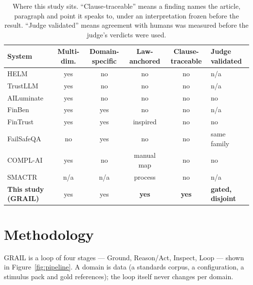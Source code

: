 \documentclass[11pt,a4paper]{article}
\begin{document}
\begin{table}[h]
\centering\footnotesize
\setlength{\tabcolsep}{4pt}
\begin{tabular}{@{}lccccl@{}}
\toprule
System & Multi-dim. & Domain-specific & Law-anchored & Clause-traceable & Judge validated \\
\midrule
HELM \cite{helm}              & yes & no   & no      & no & n/a \\
TrustLLM \cite{trustllm}      & yes & no   & no      & no & n/a \\
AILuminate \cite{ailuminate}  & yes & no   & no      & no & no \\
FinBen \cite{finben}          & yes & yes  & no      & no & n/a \\
FinTrust \cite{fintrust}      & yes & yes  & inspired& no & no \\
FailSafeQA \cite{failsafeqa}  & no  & yes  & no      & no & same family \\
COMPL-AI \cite{complai}       & yes & no   & manual map & no & no \\
SMACTR \cite{raji2020}        & n/a & n/a  & process & no & n/a \\
\textbf{This study (GRAIL)}   & yes & yes  & \textbf{yes} & \textbf{yes} & \textbf{gated, disjoint} \\
\bottomrule
\end{tabular}
\caption{Where this study sits. ``Clause-traceable'' means a finding names the article, paragraph and point it speaks to, under an interpretation frozen before the result. ``Judge validated'' means agreement with humans was measured before the judge's verdicts were used.}
\label{tab:landscape}
\end{table}

\section{Methodology}

GRAIL is a loop of four stages --- Ground, Reason/Act, Inspect, Loop ---
shown in Figure~\ref{fig:pipeline}. A domain is data (a standards corpus, a
configuration, a stimulus pack and gold references); the loop itself never
changes per domain.
\end{document}
